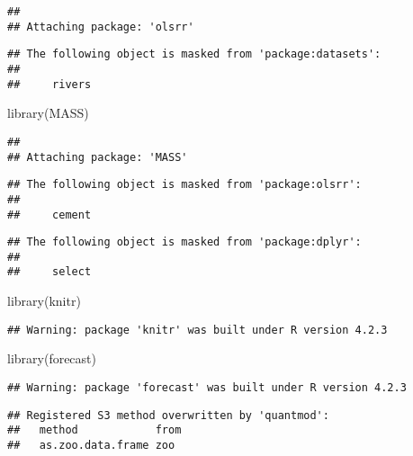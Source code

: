 \documentclass[
]{article}
\newenvironment{Shaded}{\begin{snugshade}}{\end{snugshade}}
\newcommand{\FunctionTok}[1]{\textcolor[rgb]{0.00,0.00,0.00}{#1}}
\newcommand{\NormalTok}[1]{#1}
\begin{document}
\begin{verbatim}
## 
## Attaching package: 'olsrr'
\end{verbatim}

\begin{verbatim}
## The following object is masked from 'package:datasets':
## 
##     rivers
\end{verbatim}

\begin{Shaded}
\begin{Highlighting}[]
\FunctionTok{library}\NormalTok{(MASS)}
\end{Highlighting}
\end{Shaded}

\begin{verbatim}
## 
## Attaching package: 'MASS'
\end{verbatim}

\begin{verbatim}
## The following object is masked from 'package:olsrr':
## 
##     cement
\end{verbatim}

\begin{verbatim}
## The following object is masked from 'package:dplyr':
## 
##     select
\end{verbatim}

\begin{Shaded}
\begin{Highlighting}[]
\FunctionTok{library}\NormalTok{(knitr)}
\end{Highlighting}
\end{Shaded}

\begin{verbatim}
## Warning: package 'knitr' was built under R version 4.2.3
\end{verbatim}

\begin{Shaded}
\begin{Highlighting}[]
\FunctionTok{library}\NormalTok{(forecast)}
\end{Highlighting}
\end{Shaded}

\begin{verbatim}
## Warning: package 'forecast' was built under R version 4.2.3
\end{verbatim}

\begin{verbatim}
## Registered S3 method overwritten by 'quantmod':
##   method            from
##   as.zoo.data.frame zoo
\end{verbatim}
\end{document}
